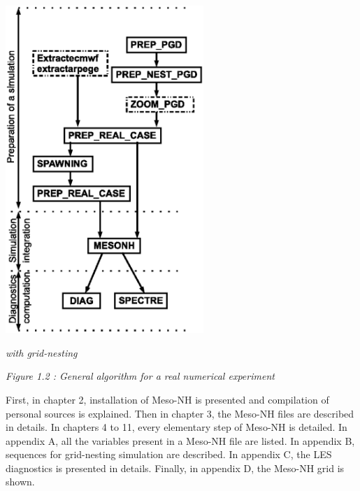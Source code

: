 \begin{minipage}{9cm}
\includegraphics[width=7.5cm]{intro/magie}
\begin{center}
\textit{with grid-nesting}
\end{center}
\end{minipage}
\begin{center}
\textit{Figure 1.2 : General algorithm for a real numerical experiment}
\end{center}




\newpage

First, in chapter 2, installation of Meso-NH is presented and compilation of personal sources is explained.
Then in chapter 3, the Meso-NH files are described in details.
In chapters 4 to 11, every elementary step of Meso-NH is detailed.
In appendix A, all the variables present in a Meso-NH file are listed. In appendix B, sequences for grid-nesting simulation are described. In appendix C, the LES diagnostics is  presented in details. Finally, in appendix D, the Meso-NH grid is shown.

